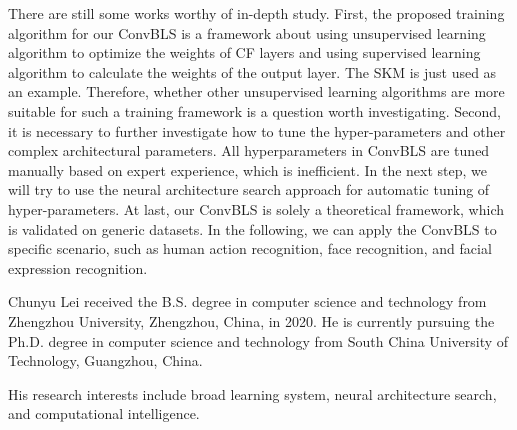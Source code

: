 \documentclass[lettersize,journal]{IEEEtran}
\begin{document}
There are still some works worthy of in-depth study. First, the proposed training algorithm for our ConvBLS is a framework about using unsupervised learning algorithm to optimize the weights of CF layers and using supervised learning algorithm to calculate the weights of the output layer. The SKM is just used as an example. Therefore, whether other unsupervised learning algorithms are more suitable for such a training framework is a question worth investigating. Second, it is necessary to further investigate how to tune the hyper-parameters and other complex architectural parameters. All hyperparameters in ConvBLS are tuned manually based on expert experience, which is inefficient. In the next step, we will try to use the neural architecture search approach for automatic tuning of hyper-parameters. At last, our ConvBLS is solely a theoretical framework, which is validated on generic datasets. In the following, we can apply the ConvBLS to specific scenario, such as human action recognition, face recognition, and facial expression recognition.



 
\begin{IEEEbiography}{Chunyu Lei}
	received the B.S. degree in computer science and technology from Zhengzhou University, Zhengzhou, China, in 2020. He is currently pursuing the Ph.D. degree in computer science and technology from South China University of Technology, Guangzhou, China. 
    
    His research interests include broad learning system, neural architecture search, and computational intelligence.
\end{IEEEbiography}
\end{document}
